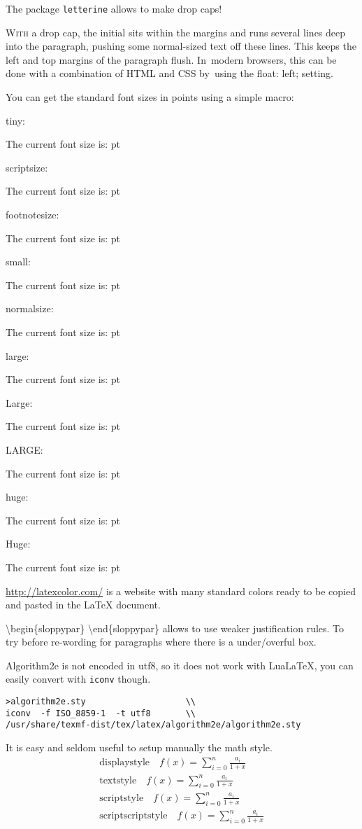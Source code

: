 \documentclass[a4paper]{article}
\makeatletter
\newcommand\thefontsize[1]{{#1 The current font size is: \f@size pt\par}}
\makeatother
\begin{document}
\vskip5mm
The package \texttt{letterine} allows to make drop caps!

\lettrine[lines=3,slope=-4pt,nindent=-4pt,findent=2pt]{W}{ith} a drop cap, the initial sits
within the margins and runs several lines deep into the paragraph, pushing some
normal-sized text off these lines. This keeps the left and top margins of the
paragraph flush.  In~modern browsers, this can be done with a combination of
HTML and CSS by~using the float: left; setting.

You can get the standard font sizes in points using a simple macro:

tiny: \thefontsize\tiny
scriptsize: \thefontsize\scriptsize
footnotesize: \thefontsize\footnotesize
small: \thefontsize\small
normalsize: \thefontsize\normalsize
large: \thefontsize\large
Large: \thefontsize\Large
LARGE: \thefontsize\LARGE
huge: \thefontsize\huge
Huge: \thefontsize\Huge


\url{http://latexcolor.com/} is a website with many standard colors ready to be copied
and pasted in the \LaTeX{} document.

\textbackslash{}begin\{sloppypar\} \textbackslash{}end\{sloppypar\} allows to
use weaker justification rules. To try before re-wording for paragraphs where
there is a under/overful box.

Algorithm2e is not encoded in utf8, so it does not work with LuaLaTeX,
you can easily convert with \texttt{iconv} though.
\begin{verbatim}
>algorithm2e.sty                    \\
iconv  -f ISO_8859-1  -t utf8       \\
/usr/share/texmf-dist/tex/latex/algorithm2e/algorithm2e.sty 
\end{verbatim}

It is easy and seldom useful to setup manually the math style.
\begin{eqnarray*}
\mathrm{displaystyle}\quad      \displaystyle      f(x) = \sum_{i=0}^{n} \frac{a_i}{1+x} \\
\mathrm{textstyle}\quad         \textstyle         f(x) = \sum_{i=0}^{n} \frac{a_i}{1+x} \\
\mathrm{scriptstyle}\quad       \scriptstyle       f(x) = \sum_{i=0}^{n} \frac{a_i}{1+x} \\
\mathrm{scriptscriptstyle}\quad \scriptscriptstyle f(x) = \sum_{i=0}^{n} \frac{a_i}{1+x}
\end{eqnarray*}
\end{document}
